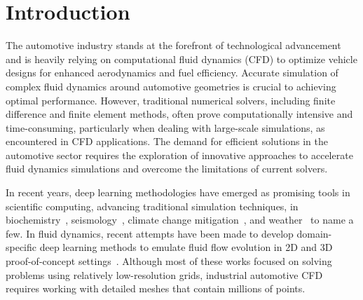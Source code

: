 \section{Introduction}

The automotive industry stands at the forefront of technological advancement and is heavily relying on computational fluid dynamics (CFD) to optimize vehicle designs for enhanced aerodynamics and fuel efficiency. Accurate simulation of complex fluid dynamics around automotive geometries is crucial to achieving optimal performance. However, traditional numerical solvers, including finite difference and finite element methods, often prove computationally intensive and time-consuming, particularly when dealing with large-scale simulations, as encountered in CFD applications. 
The demand for efficient solutions in the automotive sector requires the exploration of innovative approaches to accelerate fluid dynamics simulations and overcome the limitations of current solvers.


In recent years, deep learning methodologies have emerged as promising tools in scientific computing, advancing traditional simulation techniques, in biochemistry~\citep{jumper2021highly}, seismology~\citep{yang2021seismic}, climate change mitigation~\citep{wen2023real}, and weather~\citep{pathak2022fourcastnet,lam2022graphcast} to name a few. In fluid dynamics, recent attempts have been made to develop domain-specific deep learning methods to emulate fluid flow evolution in 2D and 3D proof-of-concept settings~\citep{jacob2021deep,li2020neural,pfaff2020learning,kossaifi2023multigrid}.
Although most of these works focused on solving problems using relatively low-resolution grids, industrial automotive CFD requires working with detailed meshes that contain millions of points.

